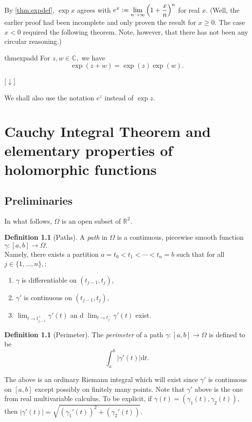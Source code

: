\documentclass[12pt,oneside]{book}
\theoremstyle{definition}
\numberwithin{thm}{chapter}
\newtheorem{defn}[thm]{Definition}
\newcommand{\downsym}{[$\downarrow$]}
\begin{document}
By \cref{thm:expdef}, $\exp x$ agrees with $e^x \vcentcolon= \displaystyle\lim_{n\to \infty}\left(1 + \frac{x}{n}\right)^n$ for real $x.$ (Well, the earlier proof had been incomplete and only proven the result for $x \ge 0.$ The case $x < 0$ required the following theorem. Note, however, that there has not been any circular reasoning.)

\begin{restatable}{thm}{expadd}
\label{thm:expadd}
	For $z, w \in \mathbb{C},$ we have
	\begin{equation*} 
		\exp(z + w) = \exp(z)\exp(w).
	\end{equation*}
\end{restatable}
\begin{flushright}\hyperref[thm:expadd2]{\downsym}\end{flushright}

We shall also use the notation $e^z$ instead of $\exp z.$

\chapter{Cauchy Integral Theorem and elementary properties of holomorphic functions}
\section{Preliminaries}
In what follows, $\Omega$ is an open subset of $\mathbb{R}^2.$
\begin{defn}[Paths]
	A \emph{path} in $\Omega$ is a continuous, piecewise smooth function $\gamma:[a, b] \to \Omega.$\\
	Namely, there exists a partition $a = t_0 < t_1 < \cdots < t_n = b$ such that for all $j \in \{1, \ldots, n\},$:
	\begin{enumerate}[label = (\roman*)]
		\item $\gamma$ is differentiable on $(t_{j-1}, t_j),$
		\item $\gamma'$ is continuous on $(t_{j-1}, t_j),$
		\item $\displaystyle\lim_{t\to t_{j-1}^+}\gamma'(t)$ an d $\displaystyle\lim_{t\to t_{j}^-}\gamma'(t)$ exist.
	\end{enumerate}
\end{defn}

\begin{defn}[Perimeter]
	The \emph{perimeter} of a path $\gamma:[a, b]\to \Omega$ is defined to be
	\begin{equation*} 
		\int_{a}^{b} \left|\gamma'(t)\right| \mathrm{d}t.
	\end{equation*}
\end{defn}
The above is an ordinary Riemann integral which will exist since $\gamma'$ is continuous on $[a, b]$ except possibly on finitely many points. Note that $\gamma'$ above is the one from real multivariable calculus. To be explicit, if $\gamma(t) = (\gamma_1(t), \gamma_2(t)),$ then $\left|\gamma'(t)\right| = \sqrt{(\gamma_1'(t))^2 + (\gamma_2'(t))}.$
\end{document}
